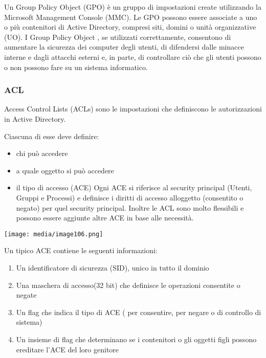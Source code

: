 Un Group Policy Object (GPO) è un gruppo di impostazioni create
utilizzando la Microsoft Management Console (MMC). Le GPO possono essere
associate a uno o più contenitori di Active Directory, compresi siti,
domini o unità organizzative (UO). I Group Policy Object , se utilizzati
correttamente, consentono di aumentare la sicurezza dei computer degli
utenti, di difendersi dalle minacce interne e dagli attacchi esterni e,
in parte, di controllare ciò che gli utenti possono o non possono fare
su un sistema informatico.

\subsubsection{ACL}\label{acl}

Access Control Lists (ACLs) sono le impostazioni che definiscono le
autorizzazioni in Active Directory.

Ciascuna di esse deve definire:

\begin{itemize}
\item
  chi può accedere
\item
  a quale oggetto si può accedere
\item
  il tipo di accesso (ACE) Ogni ACE si riferisce al security principal
  (Utenti, Gruppi e Processi) e definisce i diritti di accesso
  all\textquotesingle oggetto (consentito o negato) per quel security
  principal. Inoltre le ACL sono molto flessibili e possono essere
  aggiunte altre ACE in base alle necessità.
\end{itemize}

\texttt{[image: media/image106.png]}

Un tipico ACE contiene le seguenti informazioni:

\begin{enumerate}
\def\labelenumi{\arabic{enumi}.}
\item
  Un identificatore di sicurezza (SID), unico in tutto il dominio
\item
  Una maschera di accesso(32 bit) che definisce le operazioni consentite
  o negate
\item
  Un flag che indica il tipo di ACE ( per consentire, per negare o di
  controllo di sistema)
\item
  Un insieme di flag che determinano se i contenitori o gli oggetti
  figli possono ereditare l'ACE del loro genitore
\end{enumerate}

